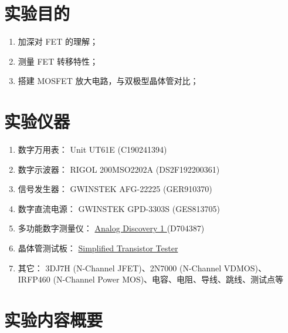 \documentclass[UTF8]{article}
\begin{document}
\section{实验目的}

\begin{enumerate}
    \item 加深对 FET 的理解；
    \item 测量 FET 转移特性；
    \item 搭建 MOSFET 放大电路，与双极型晶体管对比；
\end{enumerate}


\section{实验仪器}

\begin{enumerate}
    \item 数字万用表： Unit UT61E (C190241394)
    \item 数字示波器： RIGOL 200MSO2202A (DS2F192200361)
    \item 信号发生器： GWINSTEK AFG-22225 (GER910370)
    \item 数字直流电源： GWINSTEK GPD-3303S (GES813705)
    \item 多功能数字测量仪： 
    \href{https://digilent.com/reference/test-and-measurement/analog-discovery/start
    }{ %
    Analog Discovery 1
    } 
    (D704387)
    \item 晶体管测试板： %
    \href{https://yidingg.github.io/YiDingg/#/ElectronicDesigns/Simplified\%20Transistor\%20Tester
    }{ %
    Simplified Transistor Tester
    }
    \item 其它： 3DJ7H (N-Channel JFET)、2N7000 (N-Channel VDMOS)、 IRFP460 (N-Channel Power MOS)、电容、电阻、导线、跳线、测试点等
\end{enumerate}

\section{实验内容概要}
\end{document}
